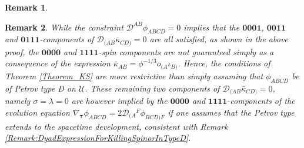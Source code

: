 \documentclass[10pt,a4paper]{article}
\theoremstyle{plain}
\newtheorem{remark}{Remark}
\def\bmg{{\bm g}}
\begin{document}
\begin{remark}
{    %


  }

\end{remark}
\begin{remark}{\em 
 While the constraint $\mathcal{D}^{AB}\phi_{ABCD}=0$ implies that the
 $\bm0\bm0\bm0\bm1$, $\bm0\bm0\bm1\bm1$ and
 $\bm0\bm1\bm1\bm1$-components of
 $\mathcal{D}_{(AB}\bar{\kappa}_{CD)}=0$ are all satisfied, as shown
 in the above proof, the $\bm0\bm0\bm0\bm0$ and
 $\bm1\bm1\bm1\bm1$-spin components are not guaranteed simply as a
 consequence of the expression
 $\bar{\kappa}_{AB}=\phi^{-1/3}o_{(A}\iota_{B)}$. Hence, the
 conditions of Theorem \ref{Theorem_KS} are more restrictive than
 simply assuming that $\phi_{ABCD}$ be of Petrov type D on
 $\mathcal{U}$. These remaining two components of
 $\mathcal{D}_{(AB}\bar{\kappa}_{CD)}=0$, namely $\sigma=\lambda=0$ are however implied by the
 $\bm0\bm0\bm0\bm0$ and $\bm1\bm1\bm1\bm1$-components of the
 \emph{evolution equation}
 $\nabla_{\bm\tau}\phi_{ABCD}=2\mathcal{D}_{(A}{}^F\phi_{BCD)F}$ if
 one \emph{assumes} that the Petrov type extends to the spacetime
 development, consistent with Remark
 \ref{Remark:DyadExpressionForKillingSpinorInTypeD}.}
\end{remark}
\end{document}
